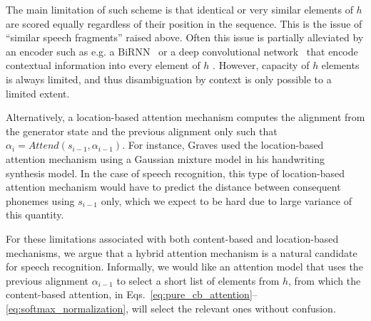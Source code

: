 \documentclass{article} %
\begin{document}
%
%
%
%

The main limitation of such scheme is that identical or very similar elements of
$h$ are scored equally regardless of their position in the
sequence. This is the issue of ``similar speech fragments'' raised above.
Often this issue is partially alleviated by an encoder such
as e.g. a BiRNN~\cite{bahdanau_neural_2014} or a deep convolutional
network~\cite{xu_show_2015} that encode contextual
information into every element of $h$ . However, capacity of
$h$ elements is always limited, and thus disambiguation by
context is only possible to a limited extent.


Alternatively, a location-based attention mechanism computes the alignment from
the generator state and the previous alignment only such that
$\alpha_{i} = Attend(s_{i-1}, \alpha_{i-1})$. 
For instance, Graves \cite{graves_generating_2013} used the location-based
attention mechanism using a Gaussian mixture model in his handwriting synthesis
model.  In the case of speech recognition, this type of location-based attention
mechanism would have to predict the distance between consequent 
phonemes using $s_{i-1}$ only, which we expect to be hard due to
large variance of this quantity.

For these limitations associated with both content-based and location-based
mechanisms, we argue that a hybrid attention mechanism is a natural candidate
for speech recognition. Informally, we would like an attention model that uses
the previous alignment $\alpha_{i-1}$ to select a short list of elements from
$h$, from which the content-based attention, in
Eqs.~\eqref{eq:pure_cb_attention}--\eqref{eq:softmax_normalization}, will select
the relevant ones without confusion.
\end{document}
